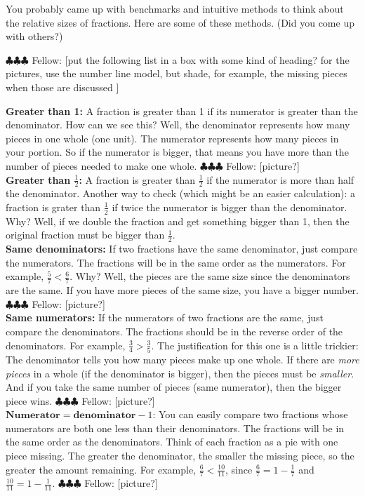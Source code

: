 \documentclass[10pt, reqno]{amsart}
\theoremstyle{remark}
\theoremstyle{definition}
\numberwithin{equation}{section}  %
\newcommand{\fellow}[1]{{\color{magenta} \sf $\clubsuit\clubsuit\clubsuit$ Fellow: [#1]}}
\begin{document}
You probably came up with benchmarks and intuitive methods to think about the relative sizes of fractions.  Here are some of these methods.  (Did you come up with others?)


\fellow{put the following list in a box with some kind of heading? for the pictures, use the number line model, but shade, for example, the missing pieces when those are discussed }

\noindent
{\bf Greater than 1:} A fraction is greater than 1 if its numerator is greater than the denominator.   How can we see this?  Well, the denominator represents how many pieces in one whole (one unit).  The numerator represents how many pieces in your portion. So if the numerator is bigger, that means you have more than the number of pieces needed to make one whole. \fellow{picture?}  \\


\noindent
{\bf Greater than $\frac 12$:} A fraction is greater than $\frac 1 2$ if the numerator is more than half the denominator.  Another way to check (which might be an easier calculation): a fraction is grater than $\frac 1 2$ if twice the numerator is bigger than the denominator.  Why?  Well, if we double the fraction and get something bigger than 1, then the original fraction must be bigger than $\frac 1 2$.\\

\noindent
{\bf Same denominators:} If two fractions have the same denominator, just compare the numerators. The fractions will be in the same order as the numerators.  For example, $\frac 5 7 < \frac 6 7$.  Why?   Well, the pieces  are the same size since the denominators are the same.  If you have more pieces of the same size, you have a bigger number. \fellow{picture?}  \\

\noindent
{\bf Same numerators: } If the numerators of two fractions are the same, just compare the denominators. The fractions should be in the reverse order of the denominators. For example, $\frac 3 4 > \frac 3 5$.  The justification for this one is a little trickier:  The denominator tells you how many pieces make up one whole.  If there are \emph{more pieces} in a whole (if the denominator is bigger), then the pieces must be \emph{smaller}.  And if you take the same number of pieces (same numerator), then the bigger piece wins.  \fellow{picture?}   \\

\noindent
$\textbf{Numerator} = \textbf{denominator} - 1$: You can easily compare two fractions whose numerators are both one less than their denominators. The fractions will be in the same order as the denominators.  Think of each fraction as a pie with one piece missing. The greater the denominator, the smaller the missing piece,  so the greater the amount remaining. For example, $\frac 6 7 < \frac{10}{11}$, since $\frac 6 7 = 1 - \frac 1 7$ and $\frac {10}{11} = 1 - \frac 1{11}$. \fellow{picture?}  \\
\end{document}
